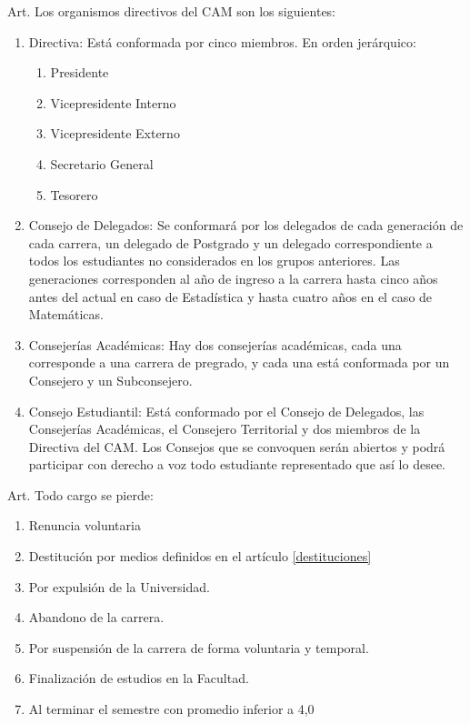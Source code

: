 \documentclass[letterpaper,11pt]{article}
\newcounter{art}
\newenvironment{art}{
    Art.\refstepcounter{art} \theart\:
}{}
\begin{document}
\begin{art}\label{definicionesOrganismos}
	Los organismos directivos del CAM son los siguientes:
	\begin{enumerate}
		\item Directiva: Está conformada por cinco miembros. En orden jerárquico:
		\begin{enumerate}
			\item Presidente
			\item Vicepresidente Interno
			\item Vicepresidente Externo
			\item Secretario General
			\item Tesorero
		\end{enumerate}
		\item Consejo de Delegados: Se conformará por los delegados de cada generación de cada carrera, un delegado de Postgrado y un delegado correspondiente a todos los estudiantes no considerados en los grupos anteriores. Las generaciones corresponden al año de ingreso a la carrera hasta cinco años antes del actual en caso de Estadística y hasta cuatro años en el caso de Matemáticas. %
		\item Consejerías Académicas: Hay dos consejerías académicas, cada una corresponde a una carrera de pregrado, y cada una está conformada por un Consejero y un Subconsejero.
		\item Consejo Estudiantil: Está conformado por el Consejo de Delegados, las Consejerías Académicas, el Consejero Territorial y dos miembros de la Directiva del CAM. Los Consejos que se convoquen serán abiertos y podrá participar con derecho a voz todo estudiante representado que así lo desee.
	\end{enumerate}
\end{art}

\begin{art}\label{}%
	Todo cargo se pierde:
	\begin{enumerate}
		\item Renuncia voluntaria
		\item Destitución por medios definidos en el artículo \ref{destituciones}
		\item Por expulsión de la Universidad.
		\item Abandono de la carrera.
		\item Por suspensión de la carrera de forma voluntaria y temporal.
		\item Finalización de estudios en la Facultad.
		\item Al terminar el semestre con promedio inferior a 4,0
	\end{enumerate}
\end{art}
\end{document}
